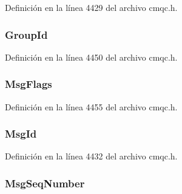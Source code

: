 Definición en la línea 4429 del archivo cmqc.\+h.

\hypertarget{structtag_m_q_m_d_abcf7ab1abd1c768c0adb9acb3d09c6f1}{}
\subsubsection[{Group\+Id}]{ Group\+Id}\label{structtag_m_q_m_d_abcf7ab1abd1c768c0adb9acb3d09c6f1}


Definición en la línea 4450 del archivo cmqc.\+h.

\hypertarget{structtag_m_q_m_d_a10cb94bb1b2528f6ad936454455bb40a}{}
\subsubsection[{Msg\+Flags}]{ Msg\+Flags}\label{structtag_m_q_m_d_a10cb94bb1b2528f6ad936454455bb40a}


Definición en la línea 4455 del archivo cmqc.\+h.

\hypertarget{structtag_m_q_m_d_a075d401c83d67ca688e6165dda74a44c}{}
\subsubsection[{Msg\+Id}]{ Msg\+Id}\label{structtag_m_q_m_d_a075d401c83d67ca688e6165dda74a44c}


Definición en la línea 4432 del archivo cmqc.\+h.

\hypertarget{structtag_m_q_m_d_a7c78a4f7c1bbda9f124f904e0d02a7a2}{}
\subsubsection[{Msg\+Seq\+Number}]{ Msg\+Seq\+Number}\label{structtag_m_q_m_d_a7c78a4f7c1bbda9f124f904e0d02a7a2}


